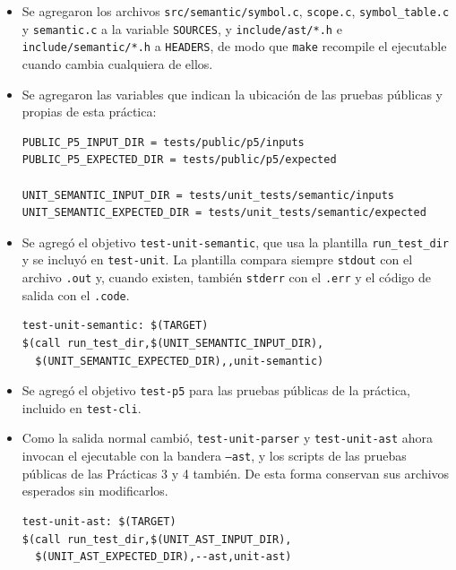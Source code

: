 \documentclass[12pt,letterpaper]{article}
\begin{document}
\begin{itemize}

\item Se agregaron los archivos \texttt{src/semantic/symbol.c}, \texttt{scope.c}, \texttt{symbol\_table.c} y
\texttt{semantic.c} a la variable \texttt{SOURCES}, y \texttt{include/ast/*.h} e
\texttt{include/semantic/*.h} a \texttt{HEADERS}, de modo que \texttt{make} recompile el ejecutable cuando
cambia cualquiera de ellos.

\item Se agregaron las variables que indican la ubicación de las pruebas públicas y propias de esta práctica:

\begin{verbatim}
PUBLIC_P5_INPUT_DIR = tests/public/p5/inputs
PUBLIC_P5_EXPECTED_DIR = tests/public/p5/expected

UNIT_SEMANTIC_INPUT_DIR = tests/unit_tests/semantic/inputs
UNIT_SEMANTIC_EXPECTED_DIR = tests/unit_tests/semantic/expected
\end{verbatim}

\item Se agregó el objetivo \texttt{test-unit-semantic}, que usa la plantilla \texttt{run\_test\_dir} y se
incluyó en \texttt{test-unit}. La plantilla compara siempre \texttt{stdout} con el archivo \texttt{.out} y,
cuando existen, también \texttt{stderr} con el \texttt{.err} y el código de salida con el \texttt{.code}.

\begin{verbatim}
test-unit-semantic: $(TARGET)
$(call run_test_dir,$(UNIT_SEMANTIC_INPUT_DIR),
  $(UNIT_SEMANTIC_EXPECTED_DIR),,unit-semantic)
\end{verbatim}

\item Se agregó el objetivo \texttt{test-p5} para las pruebas públicas de la práctica, incluido en
\texttt{test-cli}.

\item Como la salida normal cambió, \texttt{test-unit-parser} y \texttt{test-unit-ast} ahora invocan el
ejecutable con la bandera \texttt{--ast}, y los scripts de las pruebas públicas de las Prácticas 3 y 4
también. De esta forma conservan sus archivos esperados sin modificarlos.

\begin{verbatim}
test-unit-ast: $(TARGET)
$(call run_test_dir,$(UNIT_AST_INPUT_DIR),
  $(UNIT_AST_EXPECTED_DIR),--ast,unit-ast)
\end{verbatim}

\end{itemize}
\end{document}
